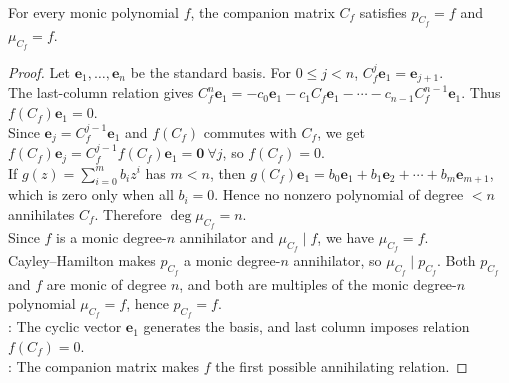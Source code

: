 \begin{theorem} \label{thm:companion-matrix-has-prescribed-minimal-polynomial} \\
For every monic polynomial $f$, the companion matrix $C_f$ satisfies $p_{C_f}=f$ and $\mu_{C_f}=f$.
\begin{proof}
Let $\mathbf{e}_1,\ldots,\mathbf{e}_n$ be the standard basis. For $0\leq j<n$, $C_f^j\mathbf{e}_1=\mathbf{e}_{j+1}$.\\
The last-column relation gives $C_f^n\mathbf{e}_1 =-c_0\mathbf{e}_1-c_1C_f\mathbf{e}_1-\cdots-c_{n-1}C_f^{n-1}\mathbf{e}_1$. Thus $f(C_f)\mathbf{e}_1=0$.\\
Since $\mathbf{e}_j=C_f^{j-1}\mathbf{e}_1$ and $f(C_f)$ commutes with $C_f$, we get $f(C_f)\mathbf{e}_j=C_f^{j-1}f(C_f)\mathbf{e}_1=\mathbf{0} \ \forall j$, so $f(C_f)=0$.\\
If $g(z)=\sum\limits_{i=0}^{m}b_iz^i$ has $m<n$, then $g(C_f)\mathbf{e}_1=b_0\mathbf{e}_1+b_1\mathbf{e}_2+\cdots+b_m\mathbf{e}_{m+1}$, which is zero only when all $b_i=0$. Hence no nonzero polynomial of degree $<n$ annihilates $C_f$. Therefore $\deg\mu_{C_f}=n$.\\
Since $f$ is a monic degree-$n$ annihilator and $\mu_{C_f}\mid f$, we have $\mu_{C_f}=f$.\\
Cayley--Hamilton makes $p_{C_f}$ a monic degree-$n$ annihilator, so $\mu_{C_f}\mid p_{C_f}$. Both $p_{C_f}$ and $f$ are monic of degree $n$, and both are multiples of the monic degree-$n$ polynomial $\mu_{C_f}=f$, hence $p_{C_f}=f$.\\
: The cyclic vector $\mathbf{e}_1$ generates the basis, and last column imposes relation $f(C_f)=0$.\\
: The companion matrix makes $f$ the first possible annihilating relation.
\end{proof}
\end{theorem}

